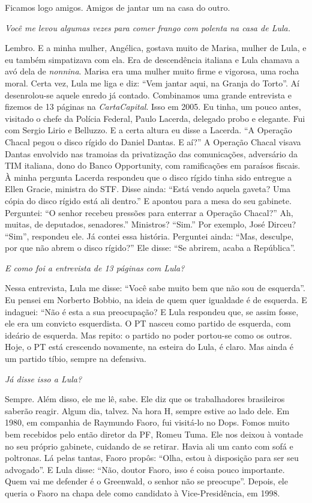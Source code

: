 \normalfont 
Ficamos logo amigos. Amigos de jantar um na casa do
outro.

\itshape
 Você me levou algumas vezes para comer frango com
polenta na casa de Lula.

\normalfont 
Lembro. E a minha mulher, Angélica, gostava muito de
Marisa, mulher de Lula, e eu também simpatizava com ela. Era de
descendência italiana e Lula chamava a avó dela de \emph{nonnina}.
Marisa era uma mulher muito firme e vigorosa, uma rocha moral. Certa
vez, Lula me liga e diz: ``Vem jantar aqui, na Granja do Torto''. Aí
desenrolou-se aquele enredo já contado. Combinamos uma grande entrevista
e fizemos de 13 páginas na \emph{CartaCapital}. Isso em 2005. Eu tinha,
um pouco antes, visitado o chefe da Polícia Federal, Paulo Lacerda,
delegado probo e elegante. Fui com Sergio Lirio e Belluzzo. E a certa
altura eu disse a Lacerda. ``A Operação Chacal pegou o disco rígido do
Daniel Dantas. E aí?'' A Operação Chacal visava Dantas envolvido nas
tramoias da privatização das comunicações, adversário da TIM italiana,
dono do Banco Opportunity, com ramificações em paraísos fiscais. À minha
pergunta Lacerda respondeu que o disco rígido tinha sido entregue a
Ellen Gracie, ministra do STF. Disse ainda: ``Está vendo aquela gaveta?
Uma cópia do disco rígido está ali dentro.'' E apontou para a mesa do
seu gabinete. Perguntei: ``O senhor recebeu pressões para enterrar a
Operação Chacal?'' Ah, muitas, de deputados, senadores.'' Ministros?
``Sim.'' Por exemplo, José Dirceu? ``Sim'', respondeu ele. Já contei
essa história. Perguntei ainda: ``Mas, desculpe, por que não abrem o
disco rígido?'' Ele disse: ``Se abrirem, acaba a República''.

\itshape
 E como foi a entrevista de 13 páginas com Lula?

\normalfont 
Nessa entrevista, Lula me disse: ``Você sabe muito bem
que não sou de esquerda''. Eu pensei em Norberto Bobbio, na ideia de
quem quer igualdade é de esquerda. E indaguei: ``Não é esta a sua
preocupação? E Lula respondeu que, se assim fosse, ele era um convicto
esquerdista. O PT nasceu como partido de esquerda, com ideário de
esquerda. Mas repito: o partido no poder portou-se como os outros. Hoje,
o PT está crescendo novamente, na esteira do Lula, é claro. Mas ainda é
um partido tíbio, sempre na defensiva.

\itshape
 Já disse isso a Lula?

\normalfont 
Sempre. Além disso, ele me lê, sabe. Ele diz que os
trabalhadores brasileiros saberão reagir. Algum dia, talvez. Na hora H,
sempre estive ao lado dele. Em 1980, em companhia de Raymundo Faoro, fui
visitá-lo no Dops. Fomos muito bem recebidos pelo então diretor da PF,
Romeu Tuma. Ele nos deixou à vontade no seu próprio gabinete, cuidando
de se retirar. Havia ali um canto com sofá e poltronas. Lá pelas tantas,
Faoro propôs: ``Olha, estou à disposição para ser seu advogado''. E Lula
disse: ``Não, doutor Faoro, isso é coisa pouco importante. Quem vai me
defender é o Greenwald, o senhor não se preocupe''. Depois, ele queria o
Faoro na chapa dele como candidato à Vice-Presidência, em 1998.

